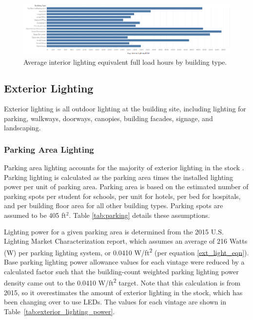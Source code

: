 \begin{figure}
    \centering \includegraphics[width=1.0\textwidth]{figures/interior_lighting_eflh.png}
    \caption[Average interior lighting equivalent full load hours by building type]{Average interior lighting equivalent full load hours by building type.}
    \label{fig:interior_lighting_eflh}
\end{figure}

\subsection{Exterior Lighting}
Exterior lighting is all outdoor lighting at the building site, including lighting for parking, walkways, doorways, canopies, building facades, signage, and landscaping.

\subsubsection{Parking Area Lighting}
Parking area lighting accounts for the majority of exterior lighting in the stock \citep{doe2015lmc}. Parking lighting is calculated as the parking area times the installed lighting power per unit of parking area. Parking area is based on the estimated number of parking spots per student for schools, per unit for hotels, per bed for hospitals, and per building floor area for all other building types.  Parking spots are assumed to be 405 ft$^2$. Table \ref{tab:parking} details these assumptions.

%

Lighting power for a given parking area is determined from the 2015 U.S. Lighting Market Characterization report, which assumes an average of 216 Watts (W) per parking lighting system, or 0.0410 W/ft\textsuperscript{2} (per equation \ref{ext_light_eqn}). Base parking lighting power allowance values for each vintage were reduced by a calculated factor such that the building-count weighted parking lighting power density came out to the 0.0410 W/ft\textsuperscript{2} target.  Note that this calculation is from 2015, so it overestimates the amount of exterior lighting in the stock, which has been changing over to use LEDs. The values for each vintage are shown in Table~\ref{tab:exterior_lighting_power}.

